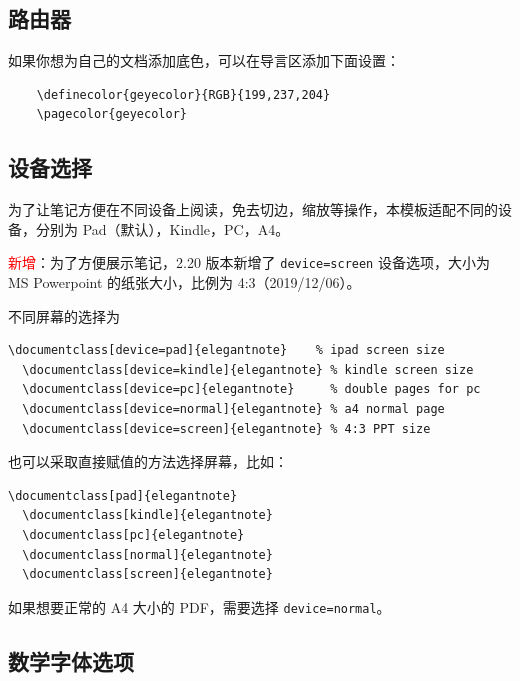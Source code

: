 \documentclass[cn,hazy,blue,10.5pt,normal]{elegantnote}
\begin{document}
\subsection{路由器}




\begin{remark}
  如果你想为自己的文档添加底色，可以在导言区添加下面设置：
  \begin{lstlisting}
    \definecolor{geyecolor}{RGB}{199,237,204}
    \pagecolor{geyecolor}
  \end{lstlisting}
\end{remark}


\subsection{设备选择}

为了让笔记方便在不同设备上阅读，免去切边，缩放等操作，本模板适配不同的设备，分别为 Pad（默认），Kindle，PC，A4。

\textcolor{red}{\kaishu 新增}：为了方便展示笔记，2.20 版本新增了 \lstinline{device=screen} 设备选项，大小为 MS Powerpoint 的纸张大小，比例为 4:3（2019/12/06）。

不同屏幕的选择为
\begin{lstlisting}[frame=none]  
  \documentclass[device=pad]{elegantnote}    % ipad screen size
  \documentclass[device=kindle]{elegantnote} % kindle screen size
  \documentclass[device=pc]{elegantnote}     % double pages for pc 
  \documentclass[device=normal]{elegantnote} % a4 normal page
  \documentclass[device=screen]{elegantnote} % 4:3 PPT size
\end{lstlisting}
\begin{note}
也可以采取直接赋值的方法选择屏幕，比如：
\end{note}
\begin{lstlisting}[frame=none]  
  \documentclass[pad]{elegantnote}
  \documentclass[kindle]{elegantnote}
  \documentclass[pc]{elegantnote}
  \documentclass[normal]{elegantnote}
  \documentclass[screen]{elegantnote}
\end{lstlisting}

\begin{note}
  如果想要正常的 A4 大小的 PDF，需要选择 \lstinline{device=normal}。
\end{note}


\subsection{数学字体选项}
\end{document}
